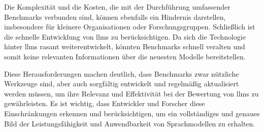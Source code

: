 Die Komplexität und die Kosten, die mit der Durchführung umfassender Benchmarks verbunden sind, können ebenfalls ein Hindernis darstellen, insbesondere für kleinere Organisationen oder Forschungsgruppen. Schließlich ist die schnelle Entwicklung von \acp{llm} zu berücksichtigen. Da sich die Technologie hinter \acp{llm} rasant weiterentwickelt, könnten Benchmarks schnell veralten und somit keine relevanten Informationen über die neuesten Modelle bereitstellen.

Diese Herausforderungen machen deutlich, dass Benchmarks zwar nützliche Werkzeuge sind, aber auch sorgfältig entwickelt und regelmäßig aktualisiert werden müssen, um ihre Relevanz und Effektivität bei der Bewertung von \acp{llm} zu gewährleisten. Es ist wichtig, dass Entwickler und Forscher diese Einschränkungen erkennen und berücksichtigen, um ein vollständiges und genaues Bild der Leistungsfähigkeit und Anwendbarkeit von Sprachmodellen zu erhalten.


